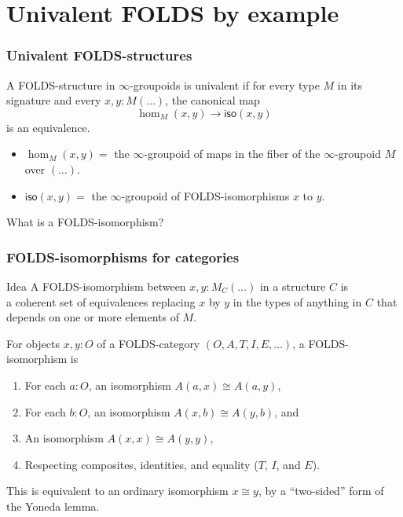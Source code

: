 \documentclass{beamer}
\begin{document}
\section{Univalent FOLDS by example}
\label{sec:univalent-folds-eg}

\begin{frame}
  \frametitle{Univalent FOLDS-structures}
  \begin{definition}
    A FOLDS-structure in $\infty$-groupoids is \alert<1>{univalent} if for every type $M$ in its signature and every $x,y:M(\dots)$, the canonical map
    \[ \hom_M(x,y) \to \mathsf{iso}(x,y) \]
    is an equivalence.
  \end{definition}
  \pause
  \begin{itemize}
  \item $\hom_M(x,y)=$ the $\infty$-groupoid of maps in the fiber of the $\infty$-groupoid $M$ over $(\dots)$.
  \item $\mathsf{iso}(x,y)=$ the $\infty$-groupoid of \alert{FOLDS-isomorphisms} $x$ to $y$.
  \end{itemize}
  What is a FOLDS-isomorphism?
\end{frame}

\begin{frame}
  \frametitle{FOLDS-isomorphisms for categories}
  \begin{block}{Idea}
    A FOLDS-isomorphism between $x,y:M_C(\dots)$ in a structure $C$ is\\\alert<1>{a coherent set of equivalences replacing $x$ by $y$ in the types of anything in $C$ that depends on one or more elements of $M$}.
  \end{block}
  \pause
  \begin{example}
  For objects $x,y:O$ of a FOLDS-category $(O,A,T,I,E,\dots)$, a FOLDS-isomorphism is
  \begin{enumerate}
  \item For each $a:O$, an isomorphism $A(a,x) \cong A(a,y)$,
  \item For each $b:O$, an isomorphism $A(x,b) \cong A(y,b)$, and
  \item An isomorphism $A(x,x) \cong A(y,y)$,
  \item Respecting composites, identities, and equality ($T$, $I$, and $E$).
  \end{enumerate}
\end{example}
  \pause
  This is equivalent to an ordinary isomorphism $x\cong y$, by a ``two-sided'' form of the Yoneda lemma.
\end{frame}
\end{document}
